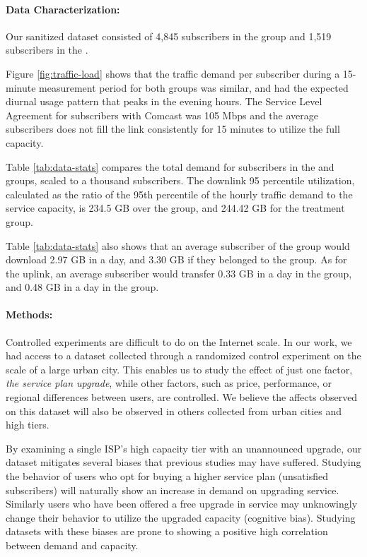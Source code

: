 \paragraph{Data Characterization: }Our sanitized dataset consisted of 4,845 
subscribers in the \control{} group and 1,519 subscribers in the \treatment{}. 

Figure \ref{fig:traffic-load} shows that the traffic demand per subscriber during
a 15-minute measurement period for both groups was similar, and had the
expected diurnal usage pattern that peaks in the evening hours.
The Service Level Agreement for subscribers with Comcast was 105 Mbps
and the average subscribers does not fill the link consistently
for 15 minutes to utilize the full capacity.

Table \ref{tab:data-stats} compares the total demand for subscribers
in the \control{} and \treatment{} groups, scaled to a thousand subscribers.
The downlink 95 percentile utilization, calculated as the ratio of the 95th 
percentile of the hourly traffic demand to the service capacity, is 234.5 GB 
over the \control{} group, and 244.42 GB for the treatment group.

Table \ref{tab:data-stats} also shows that an average subscriber of the \control{}
group would download 2.97 GB in a day, and 3.30 GB if they belonged to the \treatment{}
group. As for the uplink, an average subscriber would transfer 0.33 GB in a day in the
\control{} group, and 0.48 GB in a day in the \treatment{} group.

\paragraph{Methods: } Controlled experiments are difficult to do on the Internet scale. In
our work, we had access to a dataset collected through a randomized control 
experiment on the scale of a large urban city. This enables us to study the effect of 
just one factor, \emph{the service plan upgrade}, while other
factors, such as price, performance, or regional differences between users, are
controlled. We believe the affects observed on this dataset will also
be observed in others collected from urban cities and high tiers.

By examining a single ISP's high capacity tier with an unannounced upgrade,
our dataset mitigates several biases that previous studies may have 
suffered. Studying the behavior of users who opt for buying a higher service plan
(unsatisfied subscribers) will naturally show an increase in demand on
upgrading service. Similarly users who have been offered a free upgrade in service
may unknowingly change their behavior to utilize the upgraded capacity
(cognitive bias). Studying datasets with these biases are prone 
to showing a positive high correlation between demand and capacity. 
